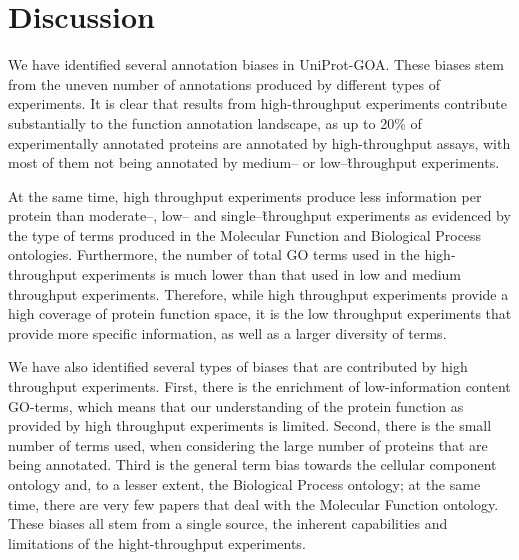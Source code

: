 \documentclass[12pt]{article}
\begin{document}
% 
% 
% 


\section*{Discussion}

We have identified several annotation biases in UniProt-GOA. These biases stem from the
uneven number of annotations produced by different types of experiments. It is clear that
results from high-throughput experiments contribute substantially to the function annotation
landscape, as up to 20\% of experimentally annotated proteins are annotated by
high-throughput assays, with most of them not being annotated by medium-- or
low--\~throughput experiments. 

At the same time, high throughput experiments produce less information per protein than
moderate--, low-- and single--\~throughput experiments as evidenced by the type of terms
produced in the Molecular Function and Biological Process ontologies. Furthermore, the
number of total GO terms used in the high-throughput experiments is much lower than that
used in low and medium throughput experiments. Therefore, while high throughput experiments
provide a high coverage of protein function space, it is the low throughput
experiments that provide more specific information, as well as a larger diversity of terms.

We have also identified several types of biases that are contributed by high throughput experiments.
First, there is the enrichment of low-information content GO-terms, which means that our
understanding of the protein function as provided by high throughput experiments is limited.
Second, there is the small number of terms used, when considering the large number of proteins that
are being annotated. Third is the general term bias towards the cellular component ontology and, to
a lesser extent, the Biological Process ontology; at the same time, there are very few papers that
deal with the Molecular Function ontology.  These biases all stem from a single source, the inherent
capabilities and limitations of the hight-throughput experiments. 
\end{document}
